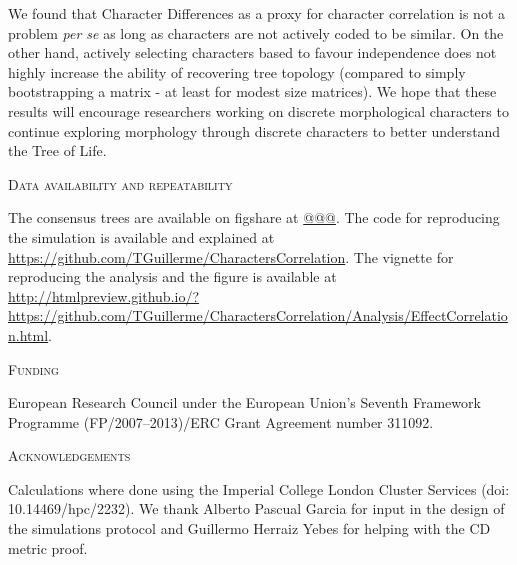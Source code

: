 \documentclass[12pt,letterpaper]{article}
\renewcommand{\section}[1]{%
\bigskip
\begin{center}
\begin{Large}
\normalfont\scshape #1
\medskip
\end{Large}
\end{center}}
\begin{document}
We found that Character Differences as a proxy for character correlation is not a problem \textit{per se} as long as characters are not actively coded to be similar.
On the other hand, actively selecting characters based to favour independence does not highly increase the ability of recovering tree topology (compared to simply bootstrapping a matrix - at least for modest size matrices).
We hope that these results will encourage researchers working on discrete morphological characters to continue exploring morphology through discrete characters to better understand the Tree of Life.

\section{Data availability and repeatability}
The consensus trees are available on figshare at \url{@@@}.
The code for reproducing the simulation is available and explained at \url{https://github.com/TGuillerme/CharactersCorrelation}.
The vignette for reproducing the analysis and the figure is available at \url{http://htmlpreview.github.io/?https://github.com/TGuillerme/CharactersCorrelation/Analysis/EffectCorrelation.html}.

\section{Funding}
European Research Council under the European Union’s Seventh Framework Programme (FP/2007–2013)/ERC Grant Agreement number 311092.

\section{Acknowledgements}
Calculations where done using the Imperial College London Cluster Services (doi: 10.14469/hpc/2232).
We thank Alberto Pascual Garcia for input in the design of the simulations protocol and Guillermo Herraiz Yebes for helping with the CD metric proof.






\end{document}

